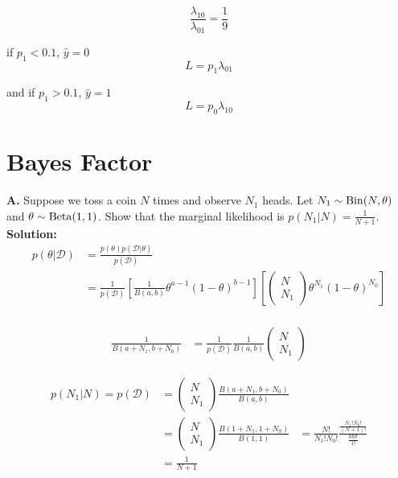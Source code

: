 \documentclass{article}
\begin{document}
\begin{equation}
 \frac{\lambda_{10}}{\lambda_{01}} = \frac{1}{9}
\end{equation}

if $p_1 <0.1$,  $\hat{y} = 0$ 
\begin{equation}
    L = p_1 \lambda_{01}
\end{equation}

and if $p_1 >0.1$, $\hat{y} = 1$ 
\begin{equation}
    L = p_0 \lambda_{10}
\end{equation}

\newpage
\section{Bayes Factor}
\textbf{A. } Suppose we toss a coin $N$ times and observe $N_{1}$ heads. Let $N_{1} \sim {\rm Bin}(N,\theta)$ and $\theta \sim {\rm Beta}(1,1)$. Show that the marginal likelihood is $p(N_{1}|N) = \frac{1}{N+1}$.
\\
\textbf{Solution:}\\
\begin{equation}
\begin{aligned}
p(\theta|\mathcal{D}) & = \frac{p(\theta) p(\mathcal{D}|\theta)}{p(\mathcal{D})} \\ 
 & = \frac{1}{p(\mathcal{D})}\left[\frac{1}{B(a,b)} \theta^{a-1}(1-\theta)^{b-1}\right] \left[\left( \begin{array}{c}  N \\  N_1
    \end{array} \right) \theta^{N_1} (1-\theta)^{N_0}\right] \\
\end{aligned}
\end{equation}

\begin{equation}
\begin{aligned}
\frac{1}{B(a+N_1,b+N_0)} & = \frac{1}{p(\mathcal{D})}\frac{1}{B(a,b)} \left( \begin{array}{c}  N \\  N_1 \end{array} \right)
\end{aligned}
\end{equation}

\begin{equation}
\begin{aligned}
p(N_{1}|N) = p(\mathcal{D}) & = \left( \begin{array}{c}  N \\  N_1 \end{array} \right)    \frac{B(a+N_1,b+N_0)}{B(a,b)} \\
& =  \left( \begin{array}{c}  N \\  N_1 \end{array} \right)    \frac{B(1+N_1,1+N_0)}{B(1,1)}
& = \frac{N!}{N_1 ! N_0 !} \frac{\frac{N_1 ! N_0 !}{(N+1)!}}{\frac{0! 0!}{1!}} \\
& = \frac{1}{N+1}
\end{aligned}
\end{equation}
\end{document}
